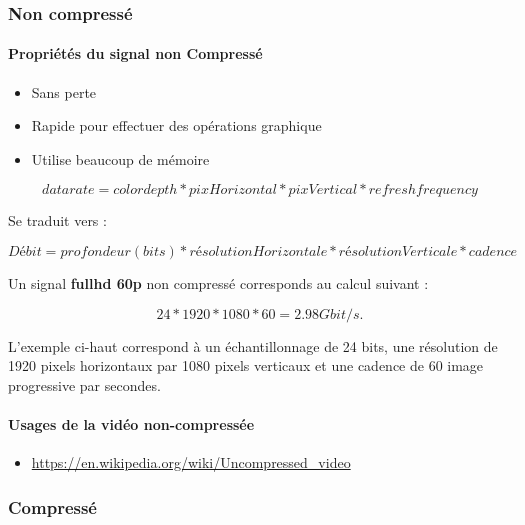\documentclass[
  french,
]{book}
\providecommand{\tightlist}{%
  \setlength{\itemsep}{0pt}\setlength{\parskip}{0pt}}
\begin{document}
\hypertarget{non-compressuxe9}{%
\subsubsection{Non compressé}\label{non-compressuxe9}}

\hypertarget{propriuxe9tuxe9s-du-signal-non-compressuxe9}{%
\paragraph{Propriétés du signal non Compressé}\label{propriuxe9tuxe9s-du-signal-non-compressuxe9}}

\begin{itemize}
\tightlist
\item
  Sans perte
\item
  Rapide pour effectuer des opérations graphique
\item
  Utilise beaucoup de mémoire
\end{itemize}

\[
data rate = color depth *  pixHorizontal * pixVertical * refresh frequency
\]

Se traduit vers :

\[
Débit = profondeur(bits)  * résolutionHorizontale * résolutionVerticale * cadence
\]

Un signal \textbf{fullhd 60p} non compressé corresponds au calcul suivant :

\[
24 * 1920 * 1080 * 60 = 2.98 Gbit/s.
\]

L'exemple ci-haut correspond à un échantillonnage de 24 bits, une résolution de 1920 pixels horizontaux par 1080 pixels verticaux et une cadence de 60 image progressive par secondes.

\hypertarget{usages-de-la-viduxe9o-non-compressuxe9e}{%
\paragraph{Usages de la vidéo non-compressée}\label{usages-de-la-viduxe9o-non-compressuxe9e}}

\begin{itemize}
\tightlist
\item
  \url{https://en.wikipedia.org/wiki/Uncompressed_video}
\end{itemize}

\hypertarget{compressuxe9}{%
\subsubsection{Compressé}\label{compressuxe9}}
\end{document}
